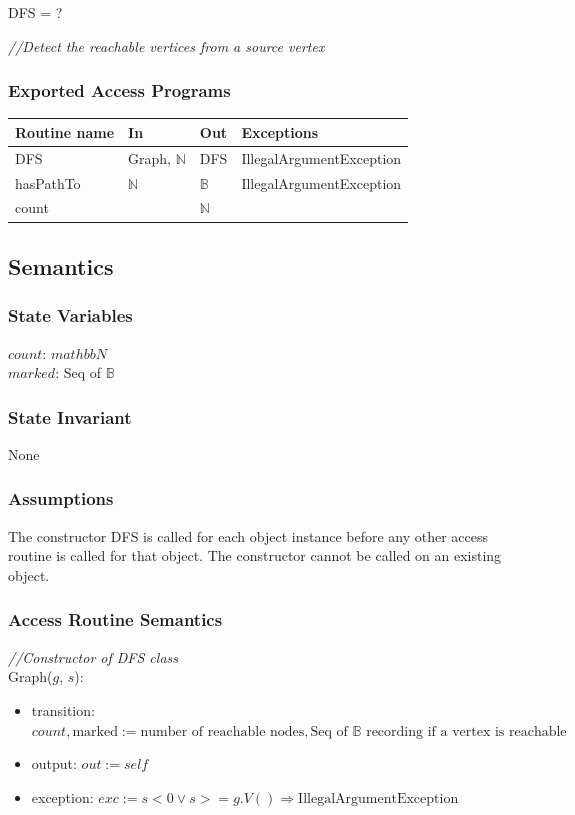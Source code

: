 \documentclass[12pt]{article}
\begin{document}
DFS = ?

\noindent \textit{//Detect the reachable vertices from a source vertex}

\subsubsection* {Exported Access Programs}

\begin{tabular}{| l | l | l | l |}
\hline
\textbf{Routine name} & \textbf{In} & \textbf{Out} & \textbf{Exceptions}\\
\hline
DFS & Graph, $\mathbb{N}$  & DFS & IllegalArgumentException\\
\hline
hasPathTo & $\mathbb{N}$ & $\mathbb{B}$ & IllegalArgumentException\\
\hline
count & ~ & $\mathbb{N}$ & ~\\
\hline
\end{tabular}


\subsection* {Semantics}

\subsubsection* {State Variables}

$count$: $mathbb{N}$\\
$marked$: Seq of $\mathbb{B}$

\subsubsection* {State Invariant}

None
\subsubsection* {Assumptions}

The constructor DFS is called for each object instance before any other access routine is called for that object.  The constructor cannot be called on
an existing object.

\subsubsection* {Access Routine Semantics}

\noindent \textit{//Constructor of DFS class}\\
Graph($g$, $s$):
\begin{itemize}
\item transition: $count, \mbox{marked} := \mbox{number of reachable nodes}, \mbox{Seq of }\mathbb{B}\mbox{ recording if a vertex is reachable}$
\item output: $out := \mathit{self}$
\item exception: $exc := s < 0 \lor s >= g.V() \Rightarrow \mbox{IllegalArgumentException}$
\end{itemize}
\end{document}
